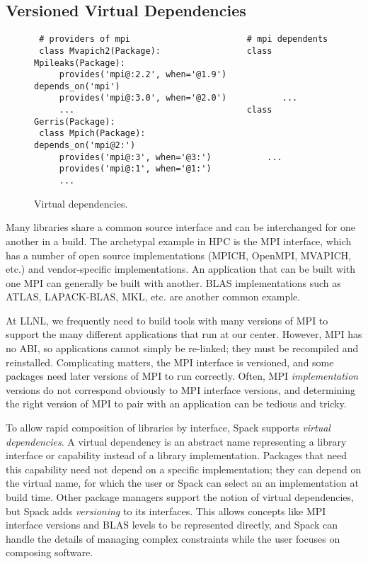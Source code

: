
\subsection{Versioned Virtual Dependencies}\label{sec:virtual}

\begin{figure}
	\begin{verbatim}
 # providers of mpi                       # mpi dependents
 class Mvapich2(Package):                 class Mpileaks(Package):
     provides('mpi@:2.2', when='@1.9')        depends_on('mpi')
     provides('mpi@:3.0', when='@2.0')           ...
     ...                                  class Gerris(Package):
 class Mpich(Package):                        depends_on('mpi@2:')
     provides('mpi@:3', when='@3:')           ...
     provides('mpi@:1', when='@1:')
     ...
\end{verbatim}
\caption{
	Virtual dependencies.
	\label{fig:virtual-deps}
}
\end{figure}

Many libraries share a common source interface and can be interchanged for
one another in a build.
The archetypal example in HPC is the MPI interface, which has a number of
open source implementations (MPICH, OpenMPI, MVAPICH, etc.) and vendor-specific
implementations. An application that can be built with one MPI can generally be
built with another.  BLAS implementations such as ATLAS, LAPACK-BLAS, MKL, etc.
are another common example.

At LLNL, we frequently need to build tools with many versions of MPI to support
the many different applications that run at our center.
However, MPI has no ABI, so applications cannot simply be re-linked;
they must be recompiled and reinstalled. 
Complicating matters, the MPI interface is versioned, and some
packages need later versions of MPI to run correctly.  Often, MPI
{\it implementation} versions do not correspond obviously to MPI
interface versions, and determining the right version of 
MPI to pair with an application can be tedious and tricky.

To allow rapid composition of libraries by interface, Spack supports
{\it virtual dependencies}.  A virtual dependency is an abstract name
representing a library interface or capability instead of a library 
implementation.  Packages that need this capability need not depend on 
a specific implementation; they can depend on the virtual name, for which
the user or Spack can select an an implementation at build time.
Other package managers support the notion of virtual dependencies, but Spack
adds {\it versioning} to its interfaces.  This allows concepts like MPI
interface versions and BLAS levels to be represented directly, and Spack can
handle the details of managing complex constraints while the user focuses on 
composing software.

